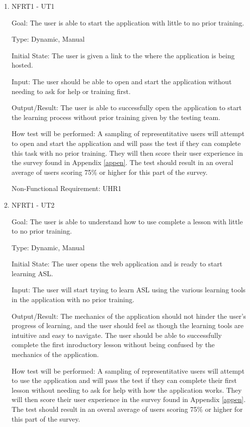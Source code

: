 \documentclass[12pt, titlepage]{article}
\begin{document}
\begin{enumerate}

\item{NFRT1 - UT1}

Goal: The user is able to start the application with little to no prior training. 

Type: Dynamic, Manual
					
Initial State: The user is given a link to the where the application is being hosted. 
					
Input: The user should be able to open and start the application without needing to ask for help or training first. 
					
Output/Result: The user is able to successfully open the application to start the learning process without prior training given by the testing team. 
					
How test will be performed: A sampling of representitative users will attempt to open and start the application and will pass the test if they can complete this task with no prior training. They will then score their user experience in the survey found in Appendix \ref{appen}. The test should result in an overal average of users scoring 75\% or higher for this part of the survey. 

Non-Functional Requirement: UHR1

\item{NFRT1 - UT2}

Goal: The user is able to understand how to use complete a lesson with little to no prior training.

Type: Dynamic, Manual
					
Initial State: The user opens the web application and is ready to start learning ASL.
					
Input: The user will start trying to learn ASL using the various learning tools in the application with no prior training.  
					
Output/Result: The mechanics of the application should not hinder the user's progress of learning, and the user should feel as though the learning tools are intuitive and easy to navigate. The user should be able to successfully complete the first inroductory lesson without being confused by the mechanics of the application. 
					
How test will be performed: A sampling of representitative users will attempt to use the application and will pass the test if they can complete their first lesson without needing to ask for help with how the application works. They will then score their user experience in the survey found in Appendix \ref{appen}. The test should result in an overal average of users scoring 75\% or higher for this part of the survey. 


\end{enumerate}
\end{document}
